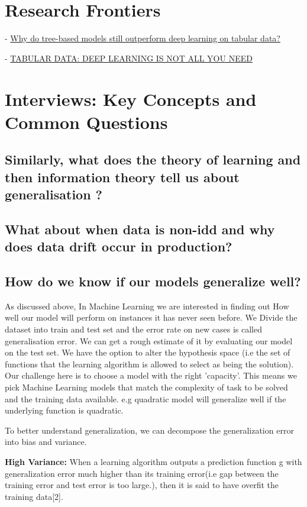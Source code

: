\documentclass[openany]{book}
\begin{document}
\section{Research Frontiers}

- \href{https://arxiv.org/pdf/2207.08815.pdf}{Why do tree-based models still outperform deep
learning on tabular data?}

- \href{https://arxiv.org/pdf/2106.03253.pdf}{TABULAR DATA: DEEP LEARNING IS NOT ALL YOU NEED}


\section{Interviews: Key Concepts and Common Questions}


\subsection{Similarly, what does the theory of learning and then information theory tell us about generalisation ? }


\subsection{What about when data is non-idd and why does data drift occur in production?}


\subsection{How do we know if our models generalize well?}

As discussed above, In Machine Learning we are interested in finding out How well our model will perform on instances it has never seen before. We Divide the dataset into train and test set and the error rate on new cases is called generalisation error. We can get a rough estimate of it by evaluating our model on the test set. We have the option to alter the hypothesis space (i.e the set of functions that the learning algorithm is allowed to select as being the solution). Our challenge here is to choose a model with the right 'capacity'. This means we pick Machine Learning models that match the complexity of task to be solved and the training data available. e.g quadratic model will generalize well if the underlying function is quadratic.

To better understand generalization, we can decompose the generalization error into bias and variance.

\textbf{High Variance:} When a learning algorithm outputs a prediction function g with generalization error much higher than its training error(i.e gap between the training error and test error is too large.), then it is said to have overfit the training data[2].
\end{document}
